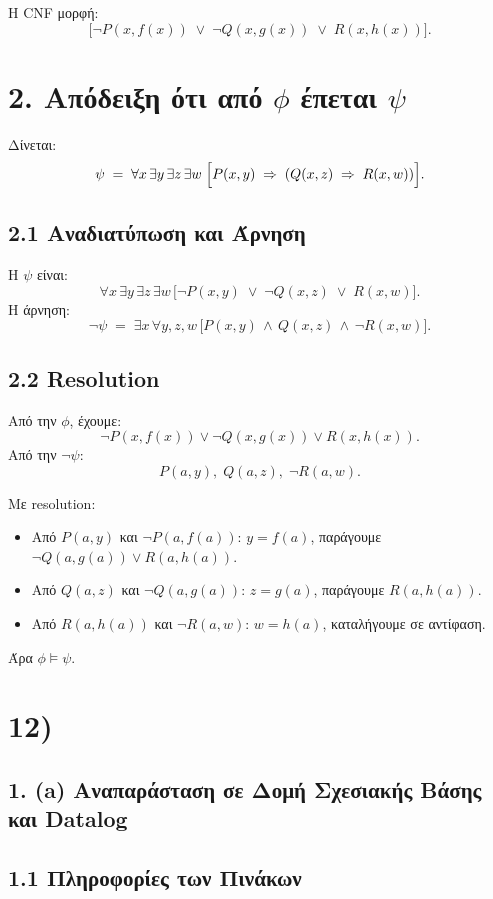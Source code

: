 \documentclass[a4paper,12pt]{article}
\begin{document}
Η CNF μορφή:
\[
\bigl[\neg P(x,f(x)) \;\lor\;\neg Q(x,g(x)) \;\lor\; R(x,h(x))\bigr].
\]

\section*{2. Απόδειξη ότι από $\phi$ έπεται $\psi$}

Δίνεται:
\[
\psi \;=\;\forall x\,\exists y\,\exists z\,\exists w\;\Bigl[P(x,y)\;\Rightarrow\;(Q(x,z)\;\Rightarrow\;R(x,w))\Bigr].
\]

\subsection*{2.1 Αναδιατύπωση και Άρνηση}

Η $\psi$ είναι:
\[
\forall x\,\exists y\,\exists z\,\exists w\,\bigl[\neg P(x,y)\;\lor\;\neg Q(x,z)\;\lor\;R(x,w)\bigr].
\]
Η άρνηση:
\[
\neg \psi \;=\; \exists x\,\forall y,z,w\,\bigl[P(x,y)\,\wedge\,Q(x,z)\,\wedge\,\neg R(x,w)\bigr].
\]

\subsection*{2.2 Resolution}

Από την $\phi$, έχουμε:
\[
\neg P(x,f(x)) \lor \neg Q(x,g(x)) \lor R(x,h(x)).
\]
Από την $\neg \psi$:
\[
P(a,y), \; Q(a,z), \; \neg R(a,w).
\]

Με resolution:
\begin{itemize}
    \item Από $P(a,y)$ και $\neg P(a,f(a))$: $y = f(a)$, παράγουμε $\neg Q(a,g(a)) \lor R(a,h(a))$.
    \item Από $Q(a,z)$ και $\neg Q(a,g(a))$: $z = g(a)$, παράγουμε $R(a,h(a))$.
    \item Από $R(a,h(a))$ και $\neg R(a,w)$: $w = h(a)$, καταλήγουμε σε αντίφαση.
\end{itemize}

Άρα $\phi \models \psi$.

\section*{12)}

\subsection*{1. (a) Αναπαράσταση σε Δομή Σχεσιακής Βάσης και Datalog}

\subsection*{1.1 Πληροφορίες των Πινάκων}
\end{document}
